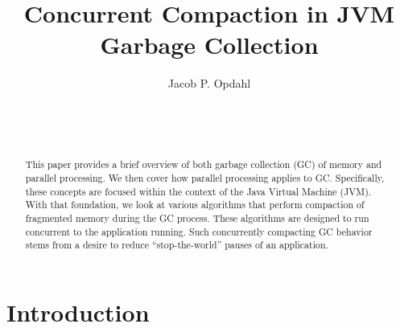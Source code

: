 \documentclass{sig-alternate}
\begin{document}

\title{Concurrent Compaction in JVM Garbage Collection}


\author{
\alignauthor
Jacob P. Opdahl\\
	\\
	\\
	\\
}

\maketitle
\begin{abstract}
This paper provides a brief overview of both garbage collection (GC) 
of memory and parallel processing. We then cover how 
parallel processing applies to GC. Specifically, these
concepts are focused within the context of the Java Virtual Machine (JVM).
With that foundation, we look at various algorithms that perform compaction of fragmented 
memory during the GC process. These algorithms are designed 
to run concurrent to the application running.
Such concurrently compacting GC behavior stems from a desire to reduce ``stop-the-world''
pauses of an application.
\end{abstract}



\section{Introduction}
\label{sec:introduction}
\end{document}
